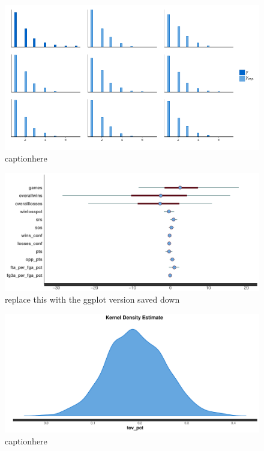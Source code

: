 \documentclass[10pt,a4paper, hidelinks]{article} %
\begin{document}
\begin{figure}
	\centering
	\includegraphics[width=1\linewidth]{../fig/polr_pp}
	\caption{captionhere}
	\label{fig:polr_pp}
\end{figure}

\begin{figure}
	\centering
	\includegraphics[width=1\linewidth]{../fig/polr_coef}
	\caption{replace this with the ggplot version saved down}
	\label{fig:polr_coef}
\end{figure}

\begin{figure}
	\centering
	\includegraphics[width=0.7\linewidth]{../fig/polr_tovpct}
	\caption{captionhere}
	\label{fig:polrtovpct}
\end{figure}
\end{document}
